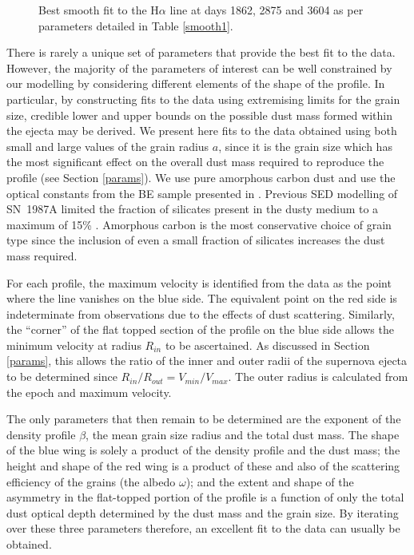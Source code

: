 \documentclass[useAMS,usenatbib,usegraphicx]{mnras}
\begin{document}
\begin{figure}
\begin{center}
\caption{Best smooth fit to the H$\alpha$ line at days 1862, 2875 and 
3604 as per parameters detailed in Table \ref{smooth1}.}
\label{d1862_3604}
\end{center}
\end{figure}


There is rarely a unique set of parameters that provide the best fit to the data.  However, the 
majority of the parameters of interest can be well constrained by our 
modelling by considering different elements of the shape of the profile.  In particular, by constructing fits to 
the data using extremising limits for the grain 
size, credible lower and upper bounds on the possible dust mass formed 
within the ejecta may be derived.  We present here
 fits to the data obtained using both small and large values of the grain radius $a$, since 
it is the grain size which has the most significant effect on the overall 
dust mass required to reproduce the profile (see Section \ref{params}).  
We use pure amorphous carbon dust and use the optical 
constants from the BE sample presented in \citet{Zubko1996}.  Previous SED
modelling of SN~1987A limited the fraction of silicates present in the dusty 
medium to a maximum of 15\% \citep{Ercolano2007,Wesson2015}. Amorphous 
carbon is the most conservative choice of grain type since the inclusion of even a small 
fraction of silicates increases the dust mass required.

For each profile, the maximum velocity is identified from the data as the 
point where the line vanishes on the blue side.  The equivalent point on 
the red side is indeterminate from observations due to the effects of 
dust scattering.  Similarly, the ``corner'' of the flat topped section of the 
profile on the blue side allows the minimum velocity at radius $R_{in}$ to be 
ascertained. As discussed in Section \ref{params}, this allows the ratio 
of the inner and outer radii of the supernova ejecta to be determined since 
$R_{in}/R_{out}=V_{min}/V_{max}$.  The outer radius is calculated from the 
epoch and maximum velocity.

The only parameters that then remain to be determined are the exponent of 
the density profile $\beta$, the mean grain size radius and the total dust mass.  The shape 
of the blue wing is solely a product of the density profile and the dust 
mass; the height and shape of the red wing is a product of these and also 
of the scattering efficiency of the grains (the albedo $\omega$); and the 
extent and shape of the asymmetry in the flat-topped portion of the 
profile is a function of only the total dust optical depth determined by the 
dust mass and the grain size.  By iterating over these three parameters 
therefore, an excellent fit to the data can usually be obtained.
\end{document}
